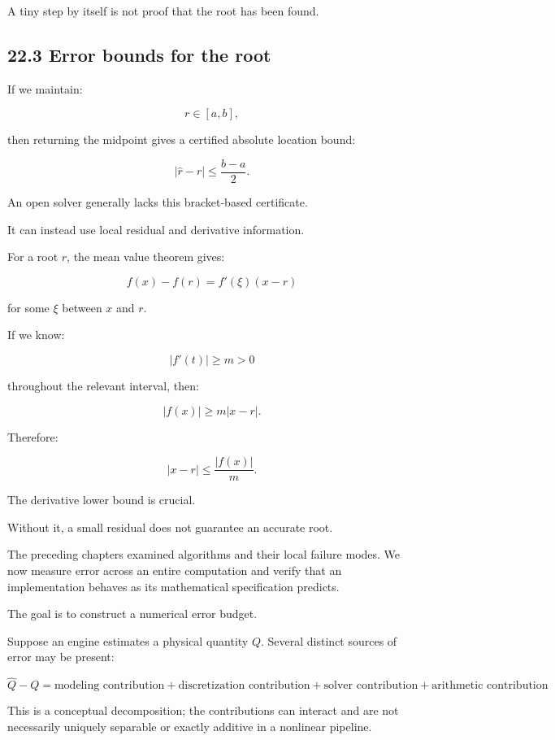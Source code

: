 A tiny step by itself is not proof that the root has been found.

\subsection{22.3 Error bounds for the root}\label{02-foundations-ii-ch028-error-bounds-for-the-root}

\hypertarget{02-foundations-ii-ch028-error-bounds-for-the-root}{}

If we maintain:

\[ r\in[a,b], \]

then returning the midpoint gives a certified absolute location bound:

\[ \boxed{ |\hat r-r|\le\frac{b-a}{2} }. \]

An open solver generally lacks this bracket-based certificate.

It can instead use local residual and derivative information.

For a root \(r\), the mean value theorem gives:

\[ f(x)-f(r)=f'(\xi)(x-r) \]

for some \(\xi\) between \(x\) and \(r\).

If we know:

\[ |f'(t)|\ge m>0 \]

throughout the relevant interval, then:

\[ |f(x)|\ge m|x-r|. \]

Therefore:

\[ \boxed{ |x-r|\le\frac{|f(x)|}{m} }. \]

The derivative lower bound is crucial.

Without it, a small residual does not guarantee an accurate root.

The preceding chapters examined algorithms and their local failure modes. We now measure error across an entire computation and verify that an implementation behaves as its mathematical specification predicts.

The goal is to construct a numerical error budget.

Suppose an engine estimates a physical quantity \(Q\). Several distinct sources of error may be present:

\[ \boxed{ \hat Q-Q = \text{modeling contribution} + \text{discretization contribution} + \text{solver contribution} + \text{arithmetic contribution} } \]

This is a conceptual decomposition; the contributions can interact and are not necessarily uniquely separable or exactly additive in a nonlinear pipeline.

